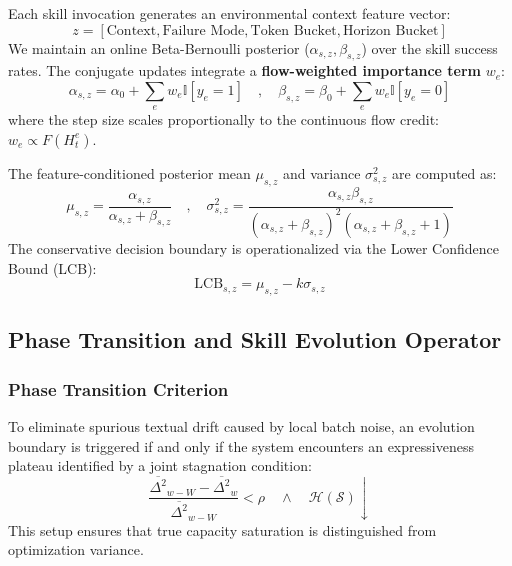 \documentclass[12pt]{article}
\begin{document}
Each skill invocation generates an environmental context feature vector:
\begin{equation}
z = [\text{Context}, \text{Failure Mode}, \text{Token Bucket}, \text{Horizon Bucket}]
\end{equation}
We maintain an online Beta-Bernoulli posterior ($\alpha_{s,z}, \beta_{s,z}$) over the skill success rates. The conjugate updates integrate a \textbf{flow-weighted importance term} $w_e$:
\begin{equation}
\alpha_{s,z} = \alpha_0 + \sum_e w_e \mathbb{I}[y_e=1]
\quad,\quad
\beta_{s,z} = \beta_0 + \sum_e w_e \mathbb{I}[y_e=0]
\end{equation}
where the step size scales proportionally to the continuous flow credit: $w_e \propto F(H_t^e)$.

The feature-conditioned posterior mean $\mu_{s,z}$ and variance $\sigma^2_{s,z}$ are computed as:
\begin{equation}
\mu_{s,z} = \frac{\alpha_{s,z}}{\alpha_{s,z} + \beta_{s,z}}
\quad,\quad
\sigma^2_{s,z} = \frac{\alpha_{s,z}\beta_{s,z}}{(\alpha_{s,z}+\beta_{s,z})^2(\alpha_{s,z}+\beta_{s,z}+1)}
\end{equation}
The conservative decision boundary is operationalized via the Lower Confidence Bound (LCB):
\begin{equation}
\text{LCB}_{s,z} = \mu_{s,z} - k\sigma_{s,z}
\end{equation}

\subsection{Phase Transition and Skill Evolution Operator}

\subsubsection{Phase Transition Criterion}
To eliminate spurious textual drift caused by local batch noise, an evolution boundary is triggered if and only if the system encounters an expressiveness plateau identified by a joint stagnation condition:
\begin{equation}
\frac{\overline{\Delta^2}_{w-W} - \overline{\Delta^2}_w}{\overline{\Delta^2}_{w-W}} < \rho \quad \land \quad \mathcal{H}(\mathcal{S}) \downarrow
\end{equation}
This setup ensures that true capacity saturation is distinguished from optimization variance.
\end{document}
